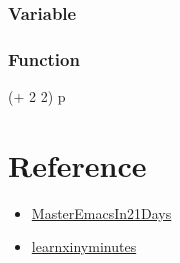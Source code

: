 \documentclass[11pt]{article}
\begin{document}
\subsubsection{Variable}
\label{sec:org0729716}

\subsubsection{Function}
\label{sec:orgb22abc7}

   (+ 2 2)
p
\section{Reference}
\label{sec:org8a263f2}
\begin{itemize}
\item \href{http://book.emacs-china.org/}{MasterEmacsIn21Days}
\item \href{https://learnxinyminutes.com/}{learnxinyminutes}
\end{itemize}
\end{document}
